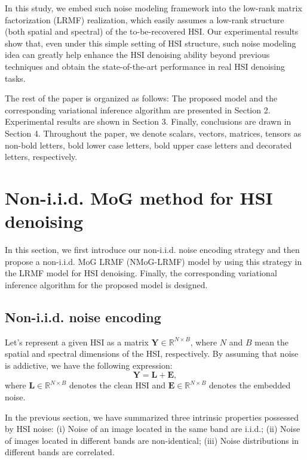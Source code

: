 \documentclass[journal]{IEEEtran}
\begin{document}
In this study, we embed such noise modeling framework into the low-rank matrix factorization (LRMF) realization, which easily assumes a low-rank structure (both spatial  and spectral) of the to-be-recovered HSI. Our experimental results show that, even under this simple setting of HSI structure, such noise modeling idea can greatly help enhance the HSI denoising ability beyond previous techniques and  obtain the state-of-the-art performance in real HSI denoising tasks.

The rest of the paper is organized as follows: The proposed model and the corresponding variational inference algorithm are presented in Section 2. Experimental results are shown in Section 3. Finally, conclusions are drawn in Section 4. Throughout the paper, we denote scalars, vectors, matrices, tensors as non-bold letters, bold lower case letters,  bold upper case letters and decorated letters, respectively.


\section{Non-i.i.d. MoG method for HSI denoising}

In this section, we first introduce our non-i.i.d. noise encoding strategy and then propose a non-i.i.d. MoG LRMF (NMoG-LRMF) model by using this strategy in the LRMF model for HSI denoising. Finally, the corresponding variational inference algorithm for the proposed model is designed.

\subsection{Non-i.i.d. noise encoding}

Let's represent a given HSI as a matrix $ \bm{Y}\in \mathbb{R} ^{N\times B} $, where $ N $ and $ B $ mean the spatial and spectral dimensions of the HSI, respectively. By assuming that noise is addictive, we have the following expression:
\begin{equation}
\bm{Y = L+E},
\end{equation}
where $ \bm{L} \in \mathbb{R}^{ N\times B } $ denotes the clean HSI  and $ \bm{E} \in \mathbb{R}^{ N\times B } $ denotes the embedded noise.

In the previous section, we have summarized three intrinsic properties possessed by HSI noise: (i) Noise of an image located in the same band are  i.i.d.; (ii) Noise of images located in different bands are non-identical; (iii) Noise distributions in different bands are correlated.
\end{document}
